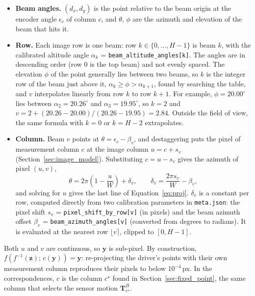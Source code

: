 \begin{itemize}
    \item \textbf{Beam angles.} $(d_x, d_y)$ is the point relative to the beam origin at the encoder angle $\epsilon_c$ of column $c$, and $\theta$, $\phi$ are the azimuth and elevation of the beam that hits it.
    \item \textbf{Row.} Each image row is one beam: row $k \in \{0, \ldots, H-1\}$ is beam $k$, with the calibrated altitude angle $\alpha_k$ = \texttt{beam\_altitude\_angles[k]}. The angles are in descending order (row $0$ is the top beam) and not evenly spaced. The elevation $\phi$ of the point generally lies between two beams, so $k$ is the integer row of the beam just above it, $\alpha_k \ge \phi > \alpha_{k+1}$, found by searching the table, and $v$ interpolates linearly from row $k$ to row $k+1$. For example, $\phi = 20.00^{\circ}$ lies between $\alpha_2 = 20.26^{\circ}$ and $\alpha_3 = 19.95^{\circ}$, so $k = 2$ and $v = 2 + (20.26 - 20.00)/(20.26 - 19.95) = 2.84$. Outside the field of view, the same formula with $k = 0$ or $k = H-2$ extrapolates.
    \item \textbf{Column.} Beam $v$ points at $\theta = \epsilon_c - \beta_v$, and destaggering puts the pixel of measurement column $c$ at the image column $u = c + s_v$ (Section~\ref{sec:image_model}). Substituting $c = u - s_v$ gives the azimuth of pixel $(u, v)$,
    \begin{equation}
        \label{eq:destagger}
        \theta = 2\pi\left(1 - \frac{u}{W}\right) + \delta_v, \qquad \delta_v = \frac{2\pi s_v}{W} - \beta_v,
    \end{equation}
    and solving for $u$ gives the last line of Equation~\eqref{eq:proj}. $\delta_v$ is a constant per row, computed directly from two calibration parameters in \texttt{meta.json}: the pixel shift $s_v$ = \texttt{pixel\_shift\_by\_row[v]} (in pixels) and the beam azimuth offset $\beta_v$ = \texttt{beam\_azimuth\_angles[v]} (converted from degrees to radians). It is evaluated at the nearest row $\lfloor v \rceil$, clipped to $[0, H-1]$.
\end{itemize}
Both $u$ and $v$ are continuous, so $\mathbf{y}$ is sub-pixel. By construction, $f\left(f^{-1}(\mathbf{z});\, c(\mathbf{y})\right) = \mathbf{y}$: re-projecting the driver's points with their own measurement column reproduces their pixels to below $10^{-4}$\,px. In the correspondences, $c$ is the column $c^{\star}$ found in Section~\ref{sec:fixed_point}, the same column that selects the sensor motion $\mathbf{T}^{B}_{c^{\star}}$.

